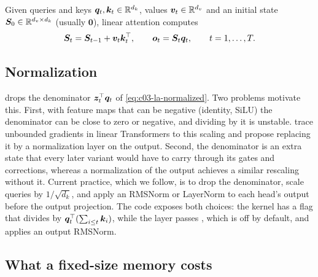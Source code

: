 \begin{definition}\label{def:c03-la}
Given queries and keys $\bm{q}_t,\bm{k}_t\in\mathbb{R}^{d_k}$, values $\bm{v}_t\in\mathbb{R}^{d_v}$ and an initial state
$\bm{S}_0\in\mathbb{R}^{d_v\times d_k}$ (usually $\bm 0$), linear attention computes
\begin{equation}\label{eq:c03-la}
  \bm{S}_t=\bm{S}_{t-1}+\bm{v}_t\bm{k}_t^{\top},\qquad \bm{o}_t=\bm{S}_t\bm{q}_t,\qquad t=1,\dots,T.
\end{equation}
\end{definition}

\subsection{Normalization}

 drops the denominator $\bm{z}_t^{\top}\bm{q}_t$ of \cref{eq:c03-la-normalized}. Two
problems motivate this. First, with feature maps that can be negative (identity, SiLU) the
denominator can be close to zero or negative, and dividing by it is unstable.
\citet{c03-qin2022devil} trace unbounded gradients in linear Transformers to this scaling and
propose replacing it by a normalization layer on the output. Second, the denominator is an
extra state that every later variant would have to carry through its gates and corrections,
whereas a normalization of the output achieves a similar rescaling without it. Current practice,
which we follow, is to drop the denominator, scale queries by $1/\sqrt{d_k}$, and apply an
RMSNorm or LayerNorm to each head's output before the output projection. The \fla{} code exposes
both choices: the kernel  has a  flag that divides by
$\bm{q}_t^{\top}(\sum_{i\le t}\bm{k}_i)$, while the  layer passes
, which is off by default, and applies an output RMSNorm.

\subsection{What a fixed-size memory costs}

